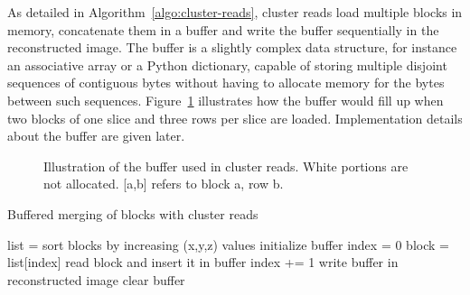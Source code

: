 \documentclass[10pt, conference, compsocconf]{IEEEtran}
\begin{document}
As detailed in Algorithm~\ref{algo:cluster-reads}, cluster reads load
multiple blocks in memory, concatenate them in a buffer and write the
buffer sequentially in the reconstructed image. The buffer is a
slightly complex data structure, for instance an associative array or
a Python dictionary, capable of storing multiple disjoint sequences of
contiguous bytes without having to allocate memory for the bytes
between such sequences. Figure~\ref{fig:cluster-reads-buffer}
illustrates how the buffer would fill up when two blocks of one slice
and three rows per slice are loaded. Implementation details about the
buffer are given later.
\begin{figure}
\centering
\def\svgwidth{\columnwidth}

\caption{Illustration of the buffer used in cluster reads. White
  portions are not allocated. [a,b] refers to block a, row b.}
\label{fig:cluster-reads-buffer}
\end{figure}
\begin{algorithm}[h]
  \caption{Buffered merging of blocks with cluster reads}
  \label{algo:cluster-reads}
  \begin{algorithmic}
    \STATE list = sort blocks by increasing (x,y,z) values
    \STATE initialize buffer
    \STATE index = 0
        \STATE block = list[index]
        \STATE read block and insert it in buffer
        \STATE index += 1
        \ENDWHILE
       \STATE write buffer in reconstructed image
       \STATE clear buffer
    \ENDWHILE
  \end{algorithmic}
\end{algorithm}
\end{document}

